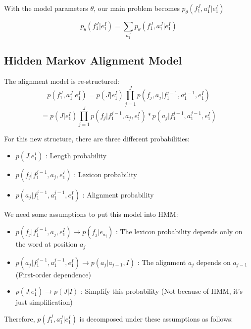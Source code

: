 \documentclass{article}
\begin{document}
\begin{equation}
\end{equation}

With the model parameters $\theta$, our main problem becomes $p_{\theta}(f_1^J, a_1^J|e_1^I)$

\begin{equation}
p_{\theta}(f_1^J|e_1^I) = \sum_{a_1^J} p_{\theta}(f_1^J, a_1^J|e_1^I)
\label{Overview about Statistical Alignment p(f,e)}
\end{equation}


\subsection{Hidden Markov Alignment Model \cite{Och2003Systematic}}
The alignment model is re-structured:
\begin{equation}
p(f_1^J, a_1^J|e_1^I) = p(J|e_1^I) \prod_{j=1}^J p(f_j, a_j | f_1^{j-1}, a_1^{j-1}, e_1^I)
\end{equation}
\begin{equation}
= p(J|e_1^I) \prod_{j=1}^J p( f_j | f_1^{j-1}, a_j, e_1^I) * p( a_j | f_1^{j-1}, a_1^{j-1}, e_1^I)
\label{Hidden Markov Alignment Model p(f, a|e)}
\end{equation}

For this new structure, there are three different probabilities:
\begin{itemize}
\item $p(J|e_1^I)$ : Length probability
\item $p( f_j | f_1^{j-1}, a_j, e_1^I)$ : Lexicon  probability
\item $p( a_j | f_1^{j-1}, a_1^{j-1}, e_1^I)$ : Alignment probability
\end{itemize}

We need some assumptions to put this model into HMM:
\begin{itemize}
\item $p( f_j | f_1^{j-1}, a_j, e_1^I) \rightarrow p(f_j | e_{a_j}) $ : The lexicon probability depends only on the word at position $a_j$
\item $p( a_j | f_1^{j-1}, a_1^{j-1}, e_1^I) \rightarrow p(a_j | a_{j-1}, I) $ : The alignment $a_j$ depends on $a_{j - 1}$  (First-order dependence)
\item $p(J|e_1^I) \rightarrow p(J|I)$ : Simplify this probability (Not because of HMM, it's just simplification)
\end{itemize}

Therefore, $p(f_1^J, a_1^J|e_1^I)$ is decomposed under these assumptions as follows:
\end{document}
